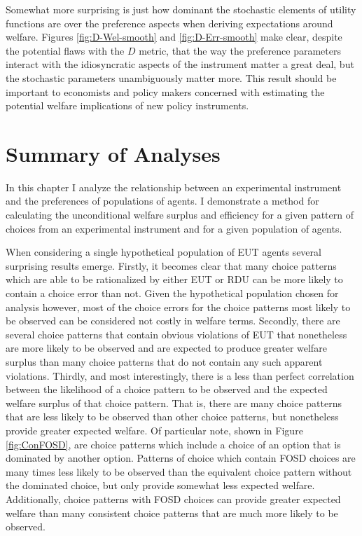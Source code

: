 \documentclass[../main.tex]{subfiles}
\begin{document}
Somewhat more surprising is just how dominant the stochastic elements of utility functions are over the preference aspects when deriving expectations around welfare.
Figures \ref{fig:D-Wel-smooth} and \ref{fig:D-Err-smooth} make clear, despite the potential flaws with the $D$ metric, that the way the preference parameters interact with the idiosyncratic aspects of the instrument matter a great deal, but the stochastic parameters unambiguously matter more.
This result should be important to economists and policy makers concerned with estimating the potential welfare implications of new policy instruments.

\section{Summary of Analyses}

In this chapter I analyze the relationship between an experimental instrument and the preferences of populations of agents.
I demonstrate a method for calculating the unconditional welfare surplus and efficiency for a given pattern of choices from an experimental instrument and for a given population of agents.

When considering a single hypothetical population of EUT agents several surprising results emerge.
Firstly, it becomes clear that many choice patterns which are able to be rationalized by either EUT or RDU can be more likely to contain a choice error than not.
Given the hypothetical population chosen for analysis however, most of the choice errors for the choice patterns most likely to be observed can be considered not costly in welfare terms.
Secondly, there are several choice patterns that contain obvious violations of EUT that nonetheless are more likely to be observed and are expected to produce greater welfare surplus than many choice patterns that do not contain any such apparent violations.
Thirdly, and most interestingly, there is a less than perfect correlation between the likelihood of a choice pattern to be observed and the expected welfare surplus of that choice pattern.
That is, there are many choice patterns that are less likely to be observed than other choice patterns, but nonetheless provide greater expected welfare.
Of particular note, shown in Figure \ref{fig:ConFOSD}, are choice patterns which include a choice of an option that is dominated by another option.
Patterns of choice which contain FOSD choices are many times less likely to be observed than the equivalent choice pattern without the dominated choice, but only provide somewhat less expected welfare.
Additionally, choice patterns with FOSD choices can provide greater expected welfare than many consistent choice patterns that are much more likely to be observed.
\end{document}
